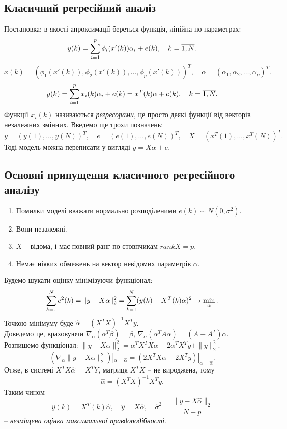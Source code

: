\subsection{Класичний регресійний аналіз}
Постановка: в якості апроксимації береться функція, лінійна по параметрах: 
\[ y(k) = \displaystyle\sum\limits_{i=1}^p \phi_i(x'(k)) \alpha_i + e(k), \quad k = \overline{1,N}. \]
\[ x(k) = (\phi_1(x'(k)), \phi_2(x'(k)), \ldots, \phi_p(x'(k)))^T, \quad \alpha = (\alpha_1, \alpha_2, \ldots, \alpha_p)^T. \]
\[ y(k) = \displaystyle\sum\limits_{i=1}^p x_i(k) \alpha_i + e(k) = x^T(k) \alpha + e(k), \quad k=\overline{1,N}. \]
Функції $x_i(k)$ називаються \textit{регресорами}, це просто деякі функції від векторів незалежних змінних. Введемо ще трохи позначень:
\[ y = (y(1), \ldots, y(N))^T,\quad e = (e(1), \ldots, e(N))^T, \quad X = (x^T(1), \ldots, x^T(N))^T. \]
Тоді модель можна переписати у вигляді $y = X\alpha + e$. \\

\subsection{Основні припущення класичного регресійного аналізу}
\begin{enumerate}
	\item Помилки моделі вважати нормально розподіленими $e(k) \sim N(0, \sigma^2)$.
	\item Вони незалежні.
	\item $X$ -- відома, і має повний ранг по стовпчикам $rank X = p$.
	\item Немає ніяких обмежень на вектор невідомих параметрів $\alpha$.
\end{enumerate}
Будемо шукати оцінку мінімізуючи функціонал: 
\[ \displaystyle\sum\limits_{k=1}^N e^2(k) = \|y - X\alpha\|_2^2 = \displaystyle\sum\limits_{k=1}^N (y(k) - X^T(k)\alpha)^2 \to \min_\alpha. \]
Точкою мінімуму буде $\widehat{\alpha} = (X^TX)^{-1}X^T y$. \\

Доведемо це, враховуючи $\nabla_\alpha(\alpha^T\beta)=\beta$, $\nabla_\alpha(\alpha^TA\alpha)=(A+A^T)\alpha$. \\

Розпишемо функціонал: $ \|y - X\alpha\|_2^2 = \alpha^TX^TX\alpha-2\alpha^TX^Ty+\|y\|_2^2$.
\[(\nabla_\alpha\|y-X\alpha\|_2^2)|_{\alpha=\widehat{\alpha}} = (2X^TX\alpha-2X^Ty)|_{\alpha=\widehat{\alpha}}. \]
Отже, в системі $X^TX\widehat{\alpha}=X^TY$, матриця $X^TX$ -- не вироджена, тому \[ \widehat{\alpha} = (X^TX)^{-1}X^Ty. \]
Таким чином \[\widehat{y}(k) = X^T(k)\widehat{\alpha}, \quad \widehat{y} = X\widehat{\alpha}, \quad \widehat{\sigma}^2 = \dfrac{\|y-X\widehat{\alpha}\|_2}{N-p}\] -- \textit{незміщена оцінка максимальної правдоподібності}.
